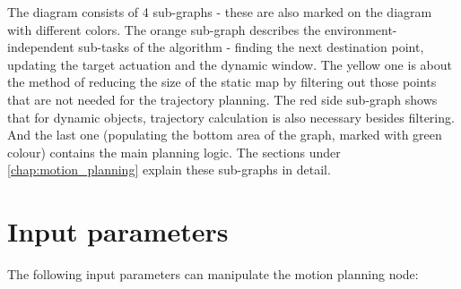 The diagram consists of 4 sub-graphs - these are also marked on the diagram with different colors. The orange sub-graph describes the environment-independent sub-tasks of the algorithm - finding the next destination point, updating the target actuation and the dynamic window. The yellow one is about the method of reducing the size of the static map by filtering out those points that are not needed for the trajectory planning. The red side sub-graph shows that for dynamic objects, trajectory calculation is also necessary besides filtering. And the last one (populating the bottom area of the graph, marked with green colour) contains the main planning logic. The sections under \ref{chap:motion_planning} explain these sub-graphs in detail.

\begin{minipage}{\textwidth}
\section{Input parameters}
\label{chap:input_parameters}
The following input parameters can manipulate the motion planning node:


\end{minipage}
